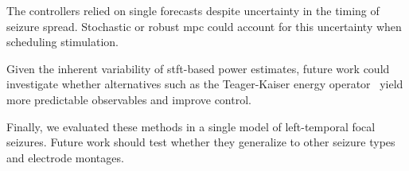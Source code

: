 The controllers relied on single forecasts despite uncertainty in the timing of seizure spread.
Stochastic or robust \ac{mpc} could account for this uncertainty when scheduling stimulation.

Given the inherent variability of \ac{stft}-based power estimates, future work could investigate whether alternatives such as the Teager-Kaiser energy operator~\cite{Chourdaki2026} yield more predictable observables and improve control.

Finally, we evaluated these methods in a single model of left-temporal focal seizures.
Future work should test whether they generalize to other seizure types and electrode montages.
